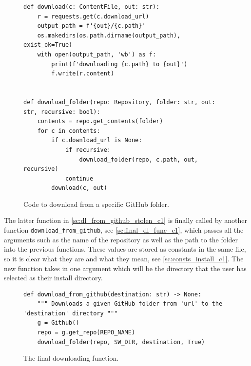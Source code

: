 \documentclass[11pt]{article}
\begin{document}
            
            \begin{figure}[!ht]
                \begin{verbatim}
def download(c: ContentFile, out: str):
    r = requests.get(c.download_url)
    output_path = f'{out}/{c.path}'
    os.makedirs(os.path.dirname(output_path), exist_ok=True)
    with open(output_path, 'wb') as f:
        print(f'downloading {c.path} to {out}')
        f.write(r.content)


def download_folder(repo: Repository, folder: str, out: str, recursive: bool):
    contents = repo.get_contents(folder)
    for c in contents:
        if c.download_url is None:
            if recursive:
                download_folder(repo, c.path, out, recursive)
            continue
        download(c, out)
                \end{verbatim}
                \caption{Code to download from a specific GitHub folder.}
                \label{sc:dl_from_github_stolen_c1}
            \end{figure}


            The latter function in \autoref{sc:dl_from_github_stolen_c1} is finally called by another function \verb|download_from_github|, see \autoref{sc:final_dl_func_c1}, which passes all the arguments such as the name of the repository as well as the path to the folder into the previous functions. These values are stored as constants in the same file, so it is clear what they are and what they mean, see \autoref{sc:consts_install_c1}. The new function takes in one argument which will be the directory that the user has selected as their install directory. 

            \begin{figure}[!ht]
                \begin{verbatim}
def download_from_github(destination: str) -> None:
    """ Downloads a given GitHub folder from 'url' to the 'destination' directory """
    g = Github()
    repo = g.get_repo(REPO_NAME)
    download_folder(repo, SW_DIR, destination, True)
                \end{verbatim}
                \caption{The final downloading function.}
                \label{sc:final_dl_func_c1}
            \end{figure}
\end{document}
